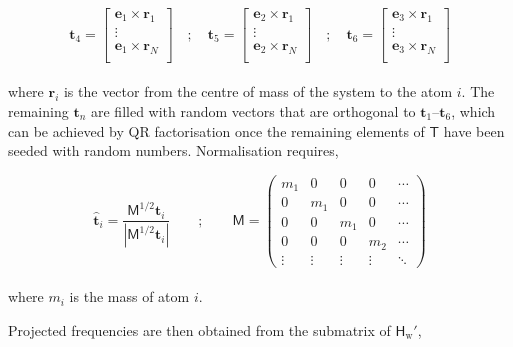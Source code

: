 \documentclass[10pt]{article}
\begin{document}
\begin{equation}
	\boldsymbol{t}_4 = \begin{bmatrix}
		\boldsymbol{e}_1 \times \boldsymbol{r}_1 \\
		\vdots \\
		\boldsymbol{e}_1 \times \boldsymbol{r}_N \\
	\end{bmatrix}
	\quad ; \quad
	\boldsymbol{t}_5 = \begin{bmatrix}
		\boldsymbol{e}_2 \times \boldsymbol{r}_1 \\
		\vdots \\
		\boldsymbol{e}_2 \times \boldsymbol{r}_N \\
	\end{bmatrix}
	\quad ; \quad
	\boldsymbol{t}_6 = \begin{bmatrix}
		\boldsymbol{e}_3 \times \boldsymbol{r}_1 \\
		\vdots \\
		\boldsymbol{e}_3 \times \boldsymbol{r}_N \\
	\end{bmatrix}
\end{equation}
\\
where $\boldsymbol{r}_i$ is the vector from the centre of mass of the system to the atom $i$. The remaining $\boldsymbol{t}_n$ are filled with random vectors that are orthogonal to $\boldsymbol{t}_1\text{--}\boldsymbol{t}_6$, which can be achieved by QR factorisation once the remaining elements of $\mathsf{T}$ have been seeded with random numbers. Normalisation requires,

\begin{equation}
	\hat{\boldsymbol{t}}_i = \frac{\mathsf{M}^{1/2}\boldsymbol{t}_i}{|\mathsf{M}^{1/2}\boldsymbol{t}_i|}
	\qquad ; \qquad
	\mathsf{M} = \begin{pmatrix}
		m_1 & 0 & 0 & 0 &\cdots \\
		0 & m_1 & 0 & 0& \cdots \\
		0 & 0 & m_1 & 0& \cdots \\
		0 & 0 & 0 & m_2 & \cdots \\
		\vdots & \vdots & \vdots & \vdots & \ddots
	\end{pmatrix}
\end{equation}
\\
where $m_i$ is the mass of atom $i$.

\vspace{0.4cm}

Projected frequencies are then obtained from the submatrix of $\mathsf{H}_\text{w}'$,
\end{document}
